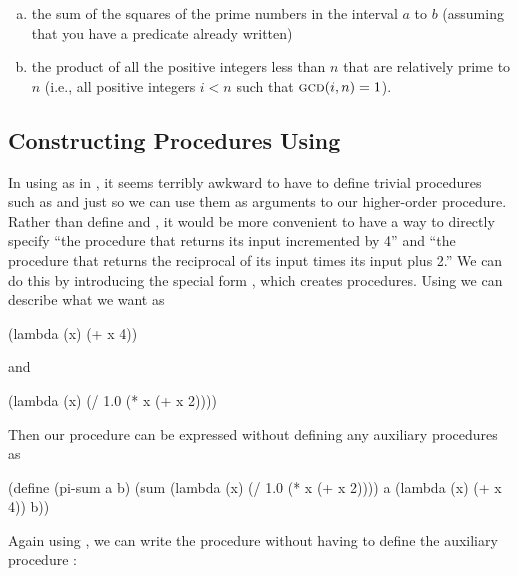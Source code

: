 \begin{exerciseGroup}
\begin{enumerate}[a.]

\item
the sum of the squares of the prime numbers in the interval \( a \) to \( b \)
(assuming that you have a  predicate already written)

\item
the product of all the positive integers less than \( n \) that are relatively
prime to \( n \) (i.e., all positive integers \( i < n \) such that
\( \textsc{gcd}(i, n) = 1 \)).

\end{enumerate}
\end{exerciseGroup}

\subsection{Constructing Procedures Using }
\label{Section 1.3.2}

In using  as in , it seems terribly awkward to
have to define trivial procedures such as  and 
just so we can use them as arguments to our higher-order procedure.  Rather
than define  and , it would be more convenient to
have a way to directly specify ``the procedure that returns its input
incremented by 4'' and ``the procedure that returns the reciprocal of its input
times its input plus 2.''  We can do this by introducing the special form
, which creates procedures.  Using  we can describe
what we want as

\begin{codeBlock}
(lambda (x) (+ x 4))
\end{codeBlock}

\noindent
and

\begin{codeBlock}
(lambda (x) (/ 1.0 (* x (+ x 2))))
\end{codeBlock}

\noindent
Then our  procedure can be expressed without defining any
auxiliary procedures as

\begin{codeBlock}
(define (pi-sum a b)
  (sum (lambda (x) (/ 1.0 (* x (+ x 2))))
       a
       (lambda (x) (+ x 4))
       b))
\end{codeBlock}

\noindent
Again using , we can write the  procedure without
having to define the auxiliary procedure :

